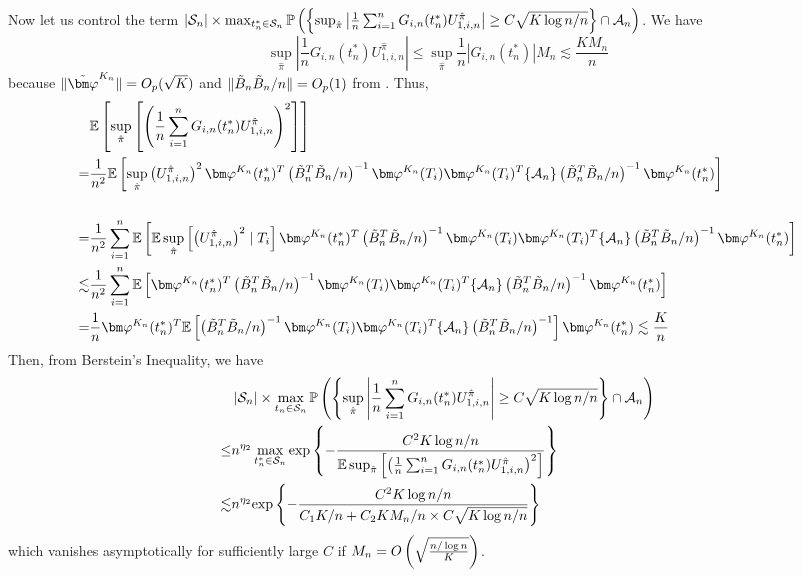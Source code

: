 Now let us control the term $\left|\mathcal{S}_{n}\right|\times\max_{t_{n}^*\in\mathcal{S}_{n}}\mathbb{P}\left(\left\{ \sup_{\hat{\pi}}\left|\frac{1}{n}\sum_{i=1}^{n}G_{i,n}(t_{n}^*)U_{1,i,n}^{\hat{\pi}}\right|\geq C\sqrt{K\log n/n}\right\} \cap\mathcal{A}_{n}\right)$.
We have
\[
\sup_{\hat{\pi}}\left|\frac{1}{n}G_{i,n}(t_{n}^*)U_{1,i,n}^{\hat{\pi}}\right|\leq\sup_{\hat{\pi}}\frac{1}{n}\left|G_{i,n}(t_{n}^*)\right|M_{n}\lesssim\frac{KM_{n}}{n}
\]
because $\|\tildevpk\|=\O_p(\sqrt{K})$ and $\|\tilde{B}_n\tilde{B}_n/n\|=O_p(1)$ from \cite{chen2015optimal}.
Thus,
\begin{align*}
 & \E\left[\sup_{\hat{\pi}}\left[\left(\frac{1}{n}\sum_{i=1}^{n}G_{i,n}(t_{n}^*)U_{1,i,n}^{\hat{\pi}}\right)^{2}\right]\right]\\
= & \frac{1}{n^{2}}\E\left[\sup_{\hat{\pi}}\left(U_{1,i,n}^{\hat{\pi}}\right)^{2}\vpk(t_{n}^*)^{T}\left(\tbn^{T}\tbn/n\right)^{-1}\vpk(T_{i})\vpk(T_{i})^{T}\{\An\}\left(\tbn^{T}\tbn/n\right)^{-1}\vpk(t_{n}^*)\right]\\
\\
= & \frac{1}{n^{2}}\sum_{i=1}^{n}\E\left[\E\sup_{\hat{\pi}}\left[\left(U_{1,i,n}^{\hat{\pi}}\right)^{2}\mid T_{i}\right]\vpk(t_{n}^*)^{T}\left(\tbn^{T}\tbn/n\right)^{-1}\vpk(T_{i})\vpk(T_{i})^{T}\{\An\}\left(\tbn^{T}\tbn/n\right)^{-1}\vpk(t_{n}^*)\right]\\
\lesssim & \frac{1}{n^{2}}\sum_{i=1}^{n}\E\left[\vpk(t_{n}^*)^{T}\left(\tbn^{T}\tbn/n\right)^{-1}\vpk(T_{i})\vpk(T_{i})^{T}\{\An\}\left(\tbn^{T}\tbn/n\right)^{-1}\vpk(t_{n}^*)\right]\\
= & \frac{1}{n}\vpk(t_{n}^*)^{T}\E\left[\left(\tbn^{T}\tbn/n\right)^{-1}\vpk(T_{i})\vpk(T_{i})^{T}\{\An\}\left(\tbn^{T}\tbn/n\right)^{-1}\right]\vpk(t_{n}^*)\lesssim\frac{K}{n}
\end{align*}
Then, from Berstein's Inequality, we have
\begin{align*}
 & \left|\mathcal{S}_{n}\right|\times\max_{t_{n}\in\mathcal{S}_{n}}\mathbb{P}\left(\left\{ \sup_{\hat{\pi}}\left|\frac{1}{n}\sum_{i=1}^{n}G_{i,n}(t_{n}^*)U_{1,i,n}^{\hat{\pi}}\right|\geq C\sqrt{K\log n/n}\right\} \cap\mathcal{A}_{n}\right)\\
\leq & n^{\eta_{2}}\max_{t_{n}^*\in\mathcal{S}_{n}}\text{exp}\left\{ -\frac{C^{2}K\log n/n}{\mathbb{E}\sup_{\hat{\pi}}\left[\left(\frac{1}{n}\sum_{i=1}^{n}G_{i,n}(t_{n}^*)U_{1,i,n}^{\hat{\pi}}\right)^{2}\right]}\right\} \\
\lesssim & n^{\eta_{2}}\text{exp}\left\{ -\frac{C^{2}K\log n/n}{C_{1}K/n+C_{2}KM_{n}/n\times C\sqrt{K\log n/n}}\right\} 
\end{align*}
which vanishes asymptotically for sufficiently large $C$ if $M_{n}=O\left(\sqrt{\frac{n/\log n}{K}}\right)$.

